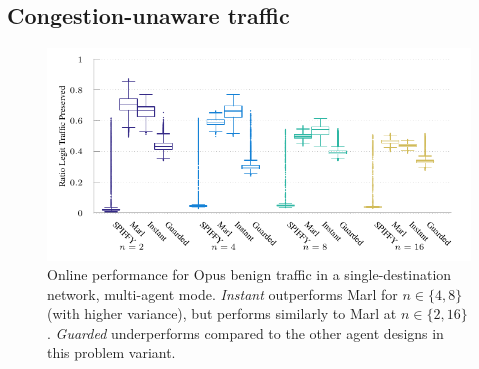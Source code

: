 \documentclass[10pt, times, comsoc]{IEEEtran}
\begin{document}
\subsection{Congestion-unaware traffic}
%	
%	
\begin{figure}
	\centering
	\cbstart
	\includegraphics[width=0.75\linewidth]{../plots/tnsm-udp-box-separate}
	\cbend
	\vspace{-0.3cm}
	\caption{
		Online performance for Opus benign traffic in a single-destination network, multi-agent mode.
		\emph{Instant} outperforms Marl for $n \in \{4, 8\}$ (with higher variance), but performs similarly to Marl at $n\in \{2, 16\}$.
		\emph{Guarded} underperforms compared to the other agent designs in this problem variant.
		\label{fig:udp-tree-box}
	}
\vspace{-0.5cm}
\end{figure}
\end{document}
